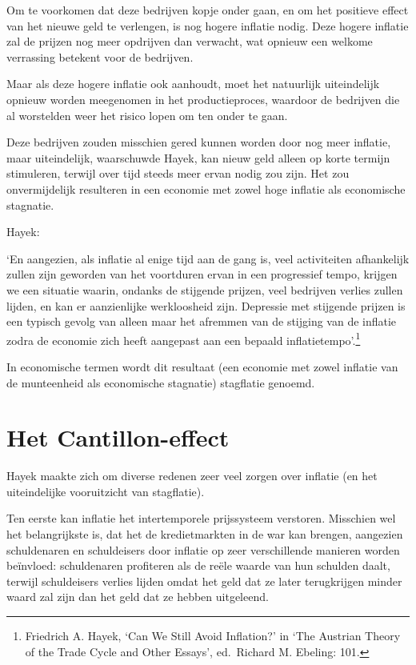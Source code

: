 \documentclass[
  a5paper,
  smalldemyvopaper,11pt,twoside,onecolumn,openright,extrafontsizes]{memoir}
\begin{document}
Om te voorkomen dat deze bedrijven kopje onder gaan, en om het positieve
effect van het nieuwe geld te verlengen, is nog hogere inflatie nodig.
Deze hogere inflatie zal de prijzen nog meer opdrijven dan verwacht, wat
opnieuw een welkome verrassing betekent voor de bedrijven.

Maar als deze hogere inflatie ook aanhoudt, moet het natuurlijk
uiteindelijk opnieuw worden meegenomen in het productieproces, waardoor
de bedrijven die al worstelden weer het risico lopen om ten onder te
gaan.

Deze bedrijven zouden misschien gered kunnen worden door nog meer
inflatie, maar uiteindelijk, waarschuwde Hayek, kan nieuw geld alleen op
korte termijn stimuleren, terwijl over tijd steeds meer ervan nodig zou
zijn. Het zou onvermijdelijk resulteren in een economie met zowel hoge
inflatie als economische stagnatie.

Hayek:

`En aangezien, als inflatie al enige tijd aan de gang is, veel
activiteiten afhankelijk zullen zijn geworden van het voortduren ervan
in een progressief tempo, krijgen we een situatie waarin, ondanks de
stijgende prijzen, veel bedrijven verlies zullen lijden, en kan er
aanzienlijke werkloosheid zijn. Depressie met stijgende prijzen is een
typisch gevolg van alleen maar het afremmen van de stijging van de
inflatie zodra de economie zich heeft aangepast aan een bepaald
inflatietempo'.\footnote{\hspace{0pt}Friedrich A. Hayek, `Can We Still
  Avoid Inflation?' in `The Austrian Theory of the Trade Cycle and Other
  Essays', ed.~Richard M. Ebeling: 101.}

In economische termen wordt dit resultaat (een economie met zowel
inflatie van de munteenheid als economische stagnatie) stagflatie
genoemd.

\section{Het Cantillon-effect}\label{het-cantillon-effect}

Hayek maakte zich om diverse redenen zeer veel zorgen over inflatie (en
het uiteindelijke vooruitzicht van stagflatie).

Ten eerste kan inflatie het intertemporele prijssysteem verstoren.
Misschien wel het belangrijkste is, dat het de kredietmarkten in de war
kan brengen, aangezien schuldenaren en schuldeisers door inflatie op
zeer verschillende manieren worden beïnvloed: schuldenaren profiteren
als de reële waarde van hun schulden daalt, terwijl schuldeisers verlies
lijden omdat het geld dat ze later terugkrijgen minder waard zal zijn
dan het geld dat ze hebben uitgeleend.
\end{document}
